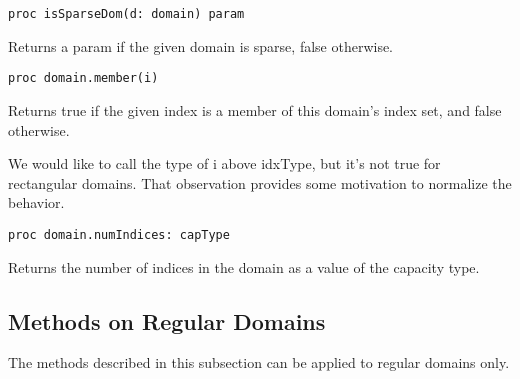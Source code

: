 \begin{protohead}
\begin{verbatim}
proc isSparseDom(d: domain) param
\end{verbatim}
\end{protohead}
\begin{protobody}
Returns a param  if the given domain is sparse, false otherwise.
\end{protobody}

\begin{protohead}
\begin{verbatim}
proc domain.member(i)
\end{verbatim}
\end{protohead}
\begin{protobody}
Returns true if the given index  is a member of this domain's index set,
and false otherwise.
\end{protobody}

\begin{openissue}
We would like to call the type of i above idxType, but it's not true
for rectangular domains.  That observation provides some motivation to normalize
the behavior.
\end{openissue}

\begin{protohead}
\begin{verbatim}
proc domain.numIndices: capType
\end{verbatim}
\end{protohead}
\begin{protobody}
Returns the number of indices in the domain as a value of the capacity type.
\end{protobody}

\subsection{Methods on Regular Domains}

The methods described in this subsection can be applied to regular domains only.

